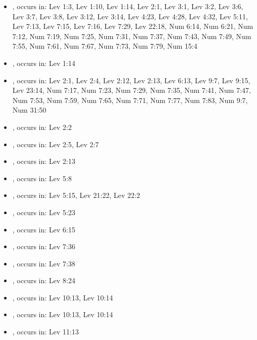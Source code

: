 \documentclass[14pt]{article}
\begin{document}
\begin{itemize}
\item {}, occurs in: Lev 1:3, Lev 1:10, Lev 1:14, Lev 2:1, Lev 3:1, Lev 3:2, Lev 3:6, Lev 3:7, Lev 3:8, Lev 3:12, Lev 3:14, Lev 4:23, Lev 4:28, Lev 4:32, Lev 5:11, Lev 7:13, Lev 7:15, Lev 7:16, Lev 7:29, Lev 22:18, Num 6:14, Num 6:21, Num 7:12, Num 7:19, Num 7:25, Num 7:31, Num 7:37, Num 7:43, Num 7:49, Num 7:55, Num 7:61, Num 7:67, Num 7:73, Num 7:79, Num 15:4

\item {}, occurs in: Lev 1:14

\item {}, occurs in: Lev 2:1, Lev 2:4, Lev 2:12, Lev 2:13, Lev 6:13, Lev 9:7, Lev 9:15, Lev 23:14, Num 7:17, Num 7:23, Num 7:29, Num 7:35, Num 7:41, Num 7:47, Num 7:53, Num 7:59, Num 7:65, Num 7:71, Num 7:77, Num 7:83, Num 9:7, Num 31:50

\item {}, occurs in: Lev 2:2

\item {}, occurs in: Lev 2:5, Lev 2:7

\item {}, occurs in: Lev 2:13

\item {}, occurs in: Lev 5:8

\item {}, occurs in: Lev 5:15, Lev 21:22, Lev 22:2

\item {}, occurs in: Lev 5:23

\item {}, occurs in: Lev 6:15

\item {}, occurs in: Lev 7:36

\item {}, occurs in: Lev 7:38

\item {}, occurs in: Lev 8:24

\item {}, occurs in: Lev 10:13, Lev 10:14

\item {}, occurs in: Lev 10:13, Lev 10:14

\item {}, occurs in: Lev 11:13


\end{itemize}
\end{document}
